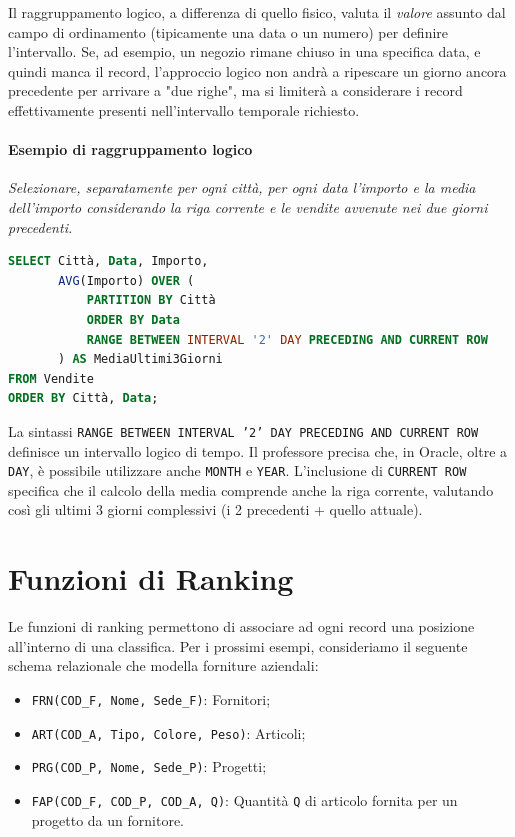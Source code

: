 Il raggruppamento logico, a differenza di quello fisico, valuta il \textit{valore} assunto dal campo di ordinamento (tipicamente una data o un numero) per definire l'intervallo. Se, ad esempio, un negozio rimane chiuso in una specifica data, e quindi manca il record, l'approccio logico non andrà a ripescare un giorno ancora precedente per arrivare a "due righe", ma si limiterà a considerare i record effettivamente presenti nell'intervallo temporale richiesto.

\paragraph{Esempio di raggruppamento logico}
\textit{Selezionare, separatamente per ogni città, per ogni data l'importo e la media dell'importo considerando la riga corrente e le vendite avvenute nei due giorni precedenti.}

\begin{lstlisting}[language=SQL, basicstyle=\small\ttfamily, keywordstyle=\bfseries\color{blue}, frame=single]
SELECT Città, Data, Importo, 
       AVG(Importo) OVER (
           PARTITION BY Città
           ORDER BY Data
           RANGE BETWEEN INTERVAL '2' DAY PRECEDING AND CURRENT ROW
       ) AS MediaUltimi3Giorni
FROM Vendite
ORDER BY Città, Data;
\end{lstlisting}
La sintassi \texttt{RANGE BETWEEN INTERVAL '2' DAY PRECEDING AND CURRENT ROW} definisce un intervallo logico di tempo. Il professore precisa che, in Oracle, oltre a \texttt{DAY}, è possibile utilizzare anche \texttt{MONTH} e \texttt{YEAR}. L'inclusione di \texttt{CURRENT ROW} specifica che il calcolo della media comprende anche la riga corrente, valutando così gli ultimi 3 giorni complessivi (i 2 precedenti + quello attuale).

\section{Funzioni di Ranking}

Le funzioni di ranking permettono di associare ad ogni record una posizione all'interno di una classifica. Per i prossimi esempi, consideriamo il seguente schema relazionale che modella forniture aziendali:
\begin{itemize}
    \item \texttt{FRN(COD\_F, Nome, Sede\_F)}: Fornitori;
    \item \texttt{ART(COD\_A, Tipo, Colore, Peso)}: Articoli;
    \item \texttt{PRG(COD\_P, Nome, Sede\_P)}: Progetti;
    \item \texttt{FAP(COD\_F, COD\_P, COD\_A, Q)}: Quantità \texttt{Q} di articolo fornita per un progetto da un fornitore.
\end{itemize}

